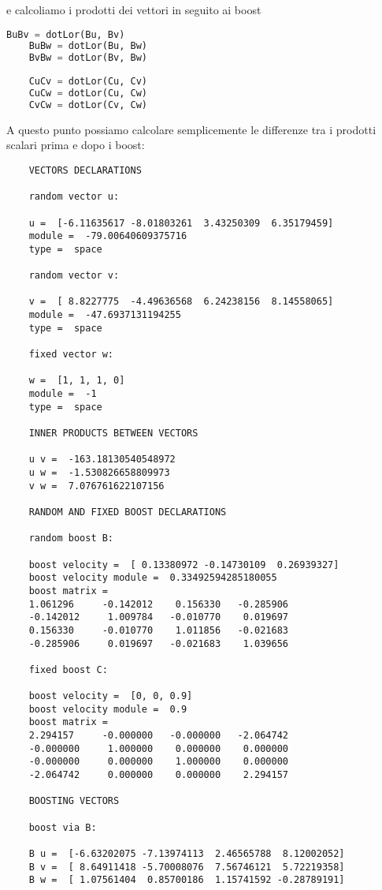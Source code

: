 \documentclass[12pt]{report}
\begin{document}
e calcoliamo i prodotti dei vettori in seguito ai boost

\begin{lstlisting}[language=Python]
	BuBv = dotLor(Bu, Bv)
	BuBw = dotLor(Bu, Bw)
	BvBw = dotLor(Bv, Bw)
	
	CuCv = dotLor(Cu, Cv)
	CuCw = dotLor(Cu, Cw)
	CvCw = dotLor(Cv, Cw)
\end{lstlisting}

A questo punto possiamo calcolare semplicemente le differenze tra i prodotti scalari prima e dopo i boost:

\begin{verbatim}
	VECTORS DECLARATIONS
	
	random vector u:
	
	u =  [-6.11635617 -8.01803261  3.43250309  6.35179459] 
	module =  -79.00640609375716 
	type =  space
	
	random vector v:
	
	v =  [ 8.8227775  -4.49636568  6.24238156  8.14558065] 
	module =  -47.6937131194255 
	type =  space
	
	fixed vector w:
	
	w =  [1, 1, 1, 0] 
	module =  -1 
	type =  space
	
	INNER PRODUCTS BETWEEN VECTORS
	
	u v =  -163.18130540548972
	u w =  -1.530826658809973
	v w =  7.076761622107156
	
	RANDOM AND FIXED BOOST DECLARATIONS
	
	random boost B:
	
	boost velocity =  [ 0.13380972 -0.14730109  0.26939327] 
	boost velocity module =  0.33492594285180055
	boost matrix =
	1.061296	 -0.142012	  0.156330	 -0.285906	
	-0.142012	  1.009784	 -0.010770	  0.019697	
	0.156330	 -0.010770	  1.011856	 -0.021683	
	-0.285906	  0.019697	 -0.021683	  1.039656	
	
	fixed boost C:
	
	boost velocity =  [0, 0, 0.9] 
	boost velocity module =  0.9
	boost matrix =
	2.294157	 -0.000000	 -0.000000	 -2.064742	
	-0.000000	  1.000000	  0.000000	  0.000000	
	-0.000000	  0.000000	  1.000000	  0.000000	
	-2.064742	  0.000000	  0.000000	  2.294157	
	
	BOOSTING VECTORS
	
	boost via B:
	
	B u =  [-6.63202075 -7.13974113  2.46565788  8.12002052]
	B v =  [ 8.64911418 -5.70008076  7.56746121  5.72219358]
	B w =  [ 1.07561404  0.85700186  1.15741592 -0.28789191]
	

\end{verbatim}
\end{document}
